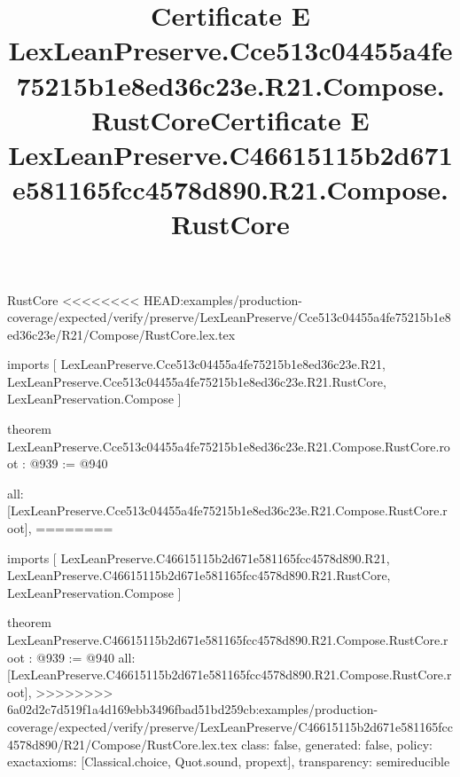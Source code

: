 \begin{lexlean}{RustCore}
<<<<<<<< HEAD:examples/production-coverage/expected/verify/preserve/LexLeanPreserve/Cce513c04455a4fe75215b1e8ed36c23e/R21/Compose/RustCore.lex.tex
\title{Certificate E LexLeanPreserve.Cce513c04455a4fe75215b1e8ed36c23e.R21.Compose.RustCore}
\begin{coremodule}
imports [
  LexLeanPreserve.Cce513c04455a4fe75215b1e8ed36c23e.R21,
  LexLeanPreserve.Cce513c04455a4fe75215b1e8ed36c23e.R21.RustCore,
  LexLeanPreservation.Compose
]

theorem LexLeanPreserve.Cce513c04455a4fe75215b1e8ed36c23e.R21.Compose.RustCore.root : @939 := @940 {
  all: [LexLeanPreserve.Cce513c04455a4fe75215b1e8ed36c23e.R21.Compose.RustCore.root],
========
\title{Certificate E LexLeanPreserve.C46615115b2d671e581165fcc4578d890.R21.Compose.RustCore}
\begin{coremodule}
imports [
  LexLeanPreserve.C46615115b2d671e581165fcc4578d890.R21,
  LexLeanPreserve.C46615115b2d671e581165fcc4578d890.R21.RustCore,
  LexLeanPreservation.Compose
]

theorem LexLeanPreserve.C46615115b2d671e581165fcc4578d890.R21.Compose.RustCore.root : @939 := @940 {
  all: [LexLeanPreserve.C46615115b2d671e581165fcc4578d890.R21.Compose.RustCore.root],
>>>>>>>> 6a02d2c7d519f1a4d169ebb3496fbad51bd259cb:examples/production-coverage/expected/verify/preserve/LexLeanPreserve/C46615115b2d671e581165fcc4578d890/R21/Compose/RustCore.lex.tex
  class: false,
  generated: false,
  policy: exact{axioms: [Classical.choice, Quot.sound, propext]},
  transparency: semireducible
}


\end{coremodule}}
\end{coremodule}
\end{lexlean}
